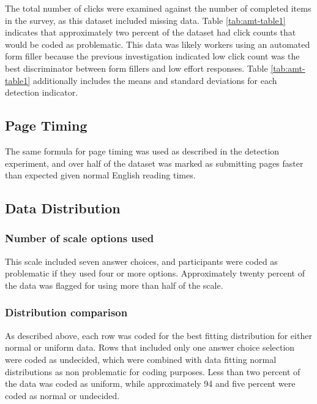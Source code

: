 \documentclass[english,man]{apa6}
\theoremstyle{definition}
\theoremstyle{definition}
\theoremstyle{definition}
\theoremstyle{remark}
\begin{document}
The total number of clicks were examined against the number of completed
items in the survey, as this dataset included missing data. Table
\ref{tab:amt-table1} indicates that approximately two percent of the
dataset had click counts that would be coded as problematic. This data
was likely workers using an automated form filler because the previous
investigation indicated low click count was the best discriminator
between form fillers and low effort responses. Table
\ref{tab:amt-table1} additionally includes the means and standard
deviations for each detection indicator.

\subsection{Page Timing}\label{page-timing-2}

The same formula for page timing was used as described in the detection
experiment, and over half of the dataset was marked as submitting pages
faster than expected given normal English reading times.

\subsection{Data Distribution}\label{data-distribution-2}

\subsubsection{Number of scale options
used}\label{number-of-scale-options-used}

This scale included seven answer choices, and participants were coded as
problematic if they used four or more options. Approximately twenty
percent of the data was flagged for using more than half of the scale.

\subsubsection{Distribution comparison}\label{distribution-comparison-1}

As described above, each row was coded for the best fitting distribution
for either normal or uniform data. Rows that included only one answer
choice selection were coded as undecided, which were combined with data
fitting normal distributions as non problematic for coding purposes.
Less than two percent of the data was coded as uniform, while
approximately 94 and five percent were coded as normal or undecided.
\end{document}
